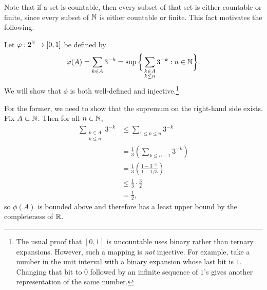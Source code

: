 \documentclass[master.tex]{subfiles}
\begin{document}
    Note that if a set is countable, then every subset of that set is either countable or finite, since every subset of $\mathbb{N}$ is either countable or finite.
    This fact motivates the following.

    Let $\varphi : 2^{\mathbb{N}} \rightarrow [0, 1]$ be defined by
    \[
        \varphi(A) = \sum_{k \in A} 3^{-k} = \sup \bigg\{ \sum_{\substack{k \in A \\ k \leq n}} 3^{-k}: n \in \mathbb{N} \bigg\}
    .\]
    We will show that $\phi$ is both well-defined and injective.\footnote{
        The usual proof that $[0, 1]$ is uncountable uses binary rather than ternary expansions.
        However, such a mapping is \emph{not} injective.
        For example, take a number in the unit interval with a binary expansion whose last bit is $1$.
        Changing that bit to $0$ followed by an infinite sequence of $1$'s gives another representation of the same number.
    }
    
    For the former, we need to show that the supremum on the right-hand side exists.
    Fix $A \subset \mathbb{N}$.
    Then for all $n \in \mathbb{N}$,
    \begin{align*}
        \sum_{\substack{k \in A \\ k \leq n}} 3^{-k} &\leq \sum_{1 \leq k \leq n} 3^{-k} \\
        &= \frac{1}{3} \left(\sum_{k \leq n - 1} 3^{-k}\right) \\
        &= \frac{1}{3} \left(\frac{1 - 3^{-n}}{1 - 1/3}\right) \\
        &\leq \frac{1}{3} \cdot \frac{3}{2} \\
        &= \frac{1}{2},
    \end{align*}
    so $\phi(A)$ is bounded above and therefore has a least upper bound by the completeness of $\mathbb{R}$.
\end{document}
